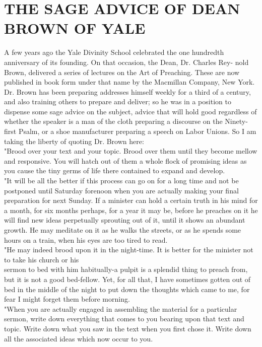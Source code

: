 \documentclass[10pt]{article}
\begin{document}
\section*{THE SAGE ADVICE OF DEAN BROWN OF YALE}
A few years ago the Yale Divinity School celebrated the one hundredth anniversary of its founding. On that occasion, the Dean, Dr. Charles Rey- nold Brown, delivered a series of lectures on the Art of Preaching. These are now published in book form under that name by the Macmillan Company, New York. Dr. Brown has been preparing addresses himself weekly for a third of a century, and also training others to prepare and deliver; so he was in a position to dispense some sage advice on the subject, advice that will hold good regardless of whether the speaker is a man of the cloth preparing a discourse on the Ninety-first Psalm, or a shoe manufacturer preparing a speech on Labor Unions. So I am taking the liberty of quoting Dr. Brown here:\\
"Brood over your text and your topic. Brood over them until they become mellow and responsive. You will hatch out of them a whole flock of promising ideas as you cause the tiny germs of life there contained to expand and develop.\\
"It will be all the better if this process can go on for a long time and not be postponed until Saturday forenoon when you are actually making your final preparation for next Sunday. If a minister can hold a certain truth in his mind for a month, for six months perhaps, for a year it may be, before he preaches on it he will find new ideas perpetually sprouting out of it, until it shows an abundant growth. He may meditate on it as he walks the streets, or as he spends some hours on a train, when his eyes are too tired to read.\\
"He may indeed brood upon it in the night-time. It is better for the minister not to take his church or his\\
sermon to bed with him habitually-a pulpit is a splendid thing to preach from, but it is not a good bed-fellow. Yet, for all that, I have sometimes gotten out of bed in the middle of the night to put down the thoughts which came to me, for fear I might forget them before morning.\\
"When you are actually engaged in assembling the material for a particular sermon, write down everything that comes to you bearing upon that text and topic. Write down what you saw in the text when you first chose it. Write down all the associated ideas which now occur to you.\\
\end{document}
